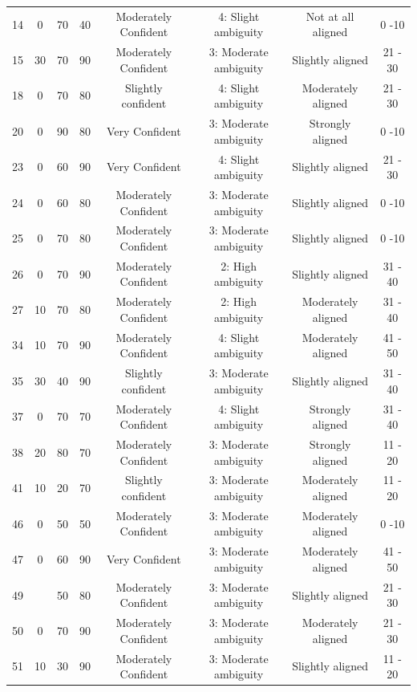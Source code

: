 \documentclass[11pt]{article}
\begin{document}
\begin{landscape}
{\begin{longtable}{cccccccc}
14 & 0 & 70 & 40 & Moderately Confident & 4: Slight ambiguity & Not at all aligned & 0 -10 \\
15 & 30 & 70 & 90 & Moderately Confident & 3: Moderate ambiguity & Slightly aligned & 21 - 30 \\
18 & 0 & 70 & 80 & Slightly confident & 4: Slight ambiguity & Moderately aligned & 21 - 30 \\
20 & 0 & 90 & 80 & Very Confident & 3: Moderate ambiguity & Strongly aligned & 0 -10 \\
23 & 0 & 60 & 90 & Very Confident & 4: Slight ambiguity & Slightly aligned & 21 - 30 \\
24 & 0 & 60 & 80 & Moderately Confident & 3: Moderate ambiguity & Slightly aligned & 0 -10 \\
25 & 0 & 70 & 80 & Moderately Confident & 3: Moderate ambiguity & Slightly aligned & 0 -10 \\
26 & 0 & 70 & 90 & Moderately Confident & 2: High ambiguity & Slightly aligned & 31 - 40 \\
27 & 10 & 70 & 80 & Moderately Confident & 2: High ambiguity & Moderately aligned & 31 - 40 \\
34 & 10 & 70 & 90 & Moderately Confident & 4: Slight ambiguity & Moderately aligned & 41 - 50 \\
35 & 30 & 40 & 90 & Slightly confident & 3: Moderate ambiguity & Slightly aligned & 31 - 40 \\
37 & 0 & 70 & 70 & Moderately Confident & 4: Slight ambiguity & Strongly aligned & 31 - 40 \\
38 & 20 & 80 & 70 & Moderately Confident & 3: Moderate ambiguity & Strongly aligned & 11 - 20 \\
41 & 10 & 20 & 70 & Slightly confident & 3: Moderate ambiguity & Moderately aligned & 11 - 20 \\
46 & 0 & 50 & 50 & Moderately Confident & 3: Moderate ambiguity & Moderately aligned & 0 -10 \\
47 & 0 & 60 & 90 & Very Confident & 3: Moderate ambiguity & Moderately aligned & 41 - 50 \\
49 & \multicolumn{1}{l}{} & 50 & 80 & Moderately Confident & 3: Moderate ambiguity & Slightly aligned & 21 - 30 \\
50 & 0 & 70 & 90 & Moderately Confident & 3: Moderate ambiguity & Moderately aligned & 21 - 30 \\
51 & 10 & 30 & 90 & Moderately Confident & 3: Moderate ambiguity & Slightly aligned & 11 - 20 \\
\bottomrule
\end{longtable}
}
\end{landscape}


\end{document}
